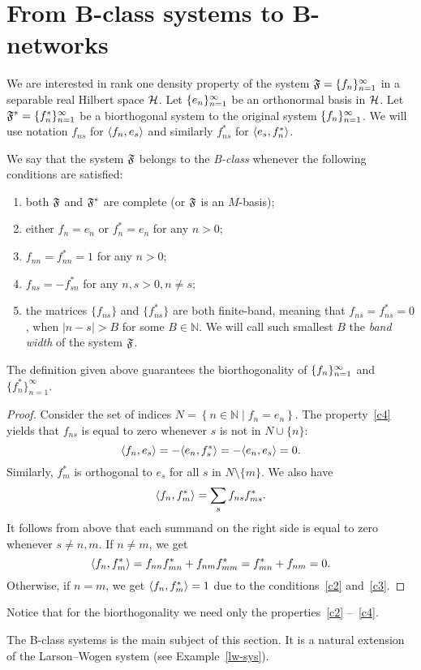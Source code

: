 \documentclass[12pt,oneside,a4paper]{amsart}
\begin{document}
\section{From B-class systems to B-networks}
    \label{sec:refor}
    \label{fsys2graphs}
    We are interested in rank one density property of the system $\fsys = \seq{f}$
      in a separable real Hilbert space $\cal{H}$.
    Let $\seq{e}$ be an orthonormal basis in $\cal{H}$.
    Let $\fstarsys = \{f_n^{*}\}_{n=1}^\infty$ be a biorthogonal system to the original system $\seq{f}$.
    We will use notation $f_{ns}$ for $\inner{f_n}{e_s}$ and similarly $f^*_{ns}$ for $\inner{e_s}{f^*_n}$.
    \begin{definition}
      We say that the system $\fsys$ belongs to the \emph{B-class} whenever the following conditions are satisfied:
      \begin{enumerate}[label=\textbf{C\arabic*}]
        \item \label{c1} both $\fsys$ and $\fstarsys$ are complete (or $\fsys$ is an $M$-basis);
        \item \label{c2} either $f_n = e_n$ or $f^*_n = e_n$ for any $n > 0$;
        \item \label{c3} $f_{nn} = f^*_{nn} = 1$ for any $n > 0$;
        \item \label{c4} $f_{ns} = -f^*_{sn}$ for any $n, s > 0, n \neq s$;
        \item \label{c5} the matrices $\{f_{ns}\}$ and $\{f^*_{ns}\}$ are both finite-band,
            meaning that $f_{ns} = f^*_{ns} = 0$, when $\lvert n - s \rvert > B$ for some $B \in \mathbb{N}$.
          We will call such smallest $B$ the \emph{band width} of the system $\fsys$.
      \end{enumerate}
    \end{definition}
    \begin{prop}
      The definition given above guarantees the biorthogonality of $\seq{f}$ and $\{f^*_n\}_{n=1}^\infty$.
    \end{prop}
    \begin{proof}
      Consider the set of indices $N = \left\{n \in \mathbb{N} \mid f_n = e_n \right\}$.
      The property~\ref{c4} yields that $f_{ns}$ is equal to zero whenever $s$ is not in $N \cup \{n\}$:
      \[
        \inner{f_n}{e_s} = -\inner{e_n}{f^*_s} = -\inner{e_n}{e_s} = 0.
      \]
      Similarly, $f^*_m$ is orthogonal to $e_s$ for all $s$ in $N \setminus \{m\}$.
      We also have
      \[
        \inner{f_n}{f^*_m} = \sum_{s} f_{ns} f_{ms}^*.
      \]
      It follows from above that each summand on the right side is equal to zero whenever $s \neq n, m$.
      If $n \neq m$, we get
      \[
        \inner{f_n}{f^*_m} = f_{nn} f^*_{mn} + f_{nm} f^*_{mm}
        = f^*_{mn} + f_{nm} = 0.
      \]
      Otherwise, if $n = m$, we get $\inner{f_n}{f^*_m} = 1$ due to the conditions~\ref{c2} and~\ref{c3}.
    \end{proof}
    \begin{remark}
      Notice that for the biorthogonality we need only the properties~\ref{c2} --~\ref{c4}.
    \end{remark}
    The B-class systems is the main subject of this section.
    It is a natural extension of the Larson--Wogen system (see Example~\ref{lw-sys}).
\end{document}

